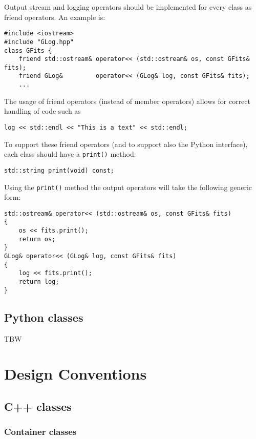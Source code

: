 \documentclass{article}[12pt,a4]
\begin{document}
Output stream and logging operators should be implemented for every class as friend
operators.
An example is:
\begin{verbatim}
#include <iostream>
#include "GLog.hpp"
class GFits {
    friend std::ostream& operator<< (std::ostream& os, const GFits& fits);
    friend GLog&         operator<< (GLog& log, const GFits& fits);
    ...
\end{verbatim}
The usage of friend operators (instead of member operators) allows for correct handling
of code such as
\begin{verbatim}
log << std::endl << "This is a text" << std::endl;
\end{verbatim}
To support these friend operators (and to support also the Python interface), each class
should have a {\tt print()} method:
\begin{verbatim}
std::string print(void) const;
\end{verbatim}
Using the {\tt print()} method the output operators will take the following generic form:
\begin{verbatim}
std::ostream& operator<< (std::ostream& os, const GFits& fits)
{
    os << fits.print();
    return os;
}
GLog& operator<< (GLog& log, const GFits& fits)
{
    log << fits.print();
    return log;
}
\end{verbatim}


\subsection{Python classes}

TBW

\section{Design Conventions}

\subsection{C++ classes}

\subsubsection{Container classes}
\end{document}
